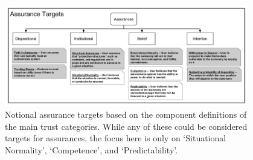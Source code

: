 \begin{figure}[t]%
    \includegraphics[width=0.95\textwidth]{Figures/Assurances.pdf}%
    \caption{Notional assurance targets based on the component definitions of the main trust categories. While any of these could be considered targets for assurances, the focus here is only on `Situational Normality', `Competence', and `Predictability'.}
    \label{fig:Assurance_classes}
    \vspace{-0.2 in}
\end{figure}
